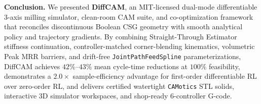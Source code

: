 \documentclass[conference]{IEEEtran}
\begin{document}
\textbf{Conclusion.}
We presented \textbf{DiffCAM}, an MIT-licensed dual-mode differentiable 3-axis milling simulator, clean-room CAM suite, and co-optimization framework that reconciles discontinuous Boolean CSG geometry with smooth analytical policy and trajectory gradients. By combining Straight-Through Estimator stiffness continuation, controller-matched corner-blending kinematics, volumetric Peak MRR barriers, and drift-free \texttt{JointPathFeedSpline} parameterizations, DiffCAM achieves $42\%$--$43\%$ mean cycle-time reductions at $100\%$ feasibility, demonstrates a $2.0\times$ sample-efficiency advantage for first-order differentiable RL over zero-order RL, and delivers certified watertight \texttt{CAMotics} STL solids, interactive 3D simulator workspaces, and shop-ready 6-controller G-code.


{\small
\setlength{\bibsep}{2.5pt}

}
\end{document}
